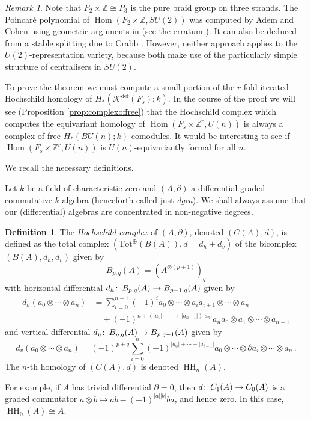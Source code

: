 \documentclass[oneside, a4paper, 12pt]{article}
\numberwithin{equation}{section}
\DeclareMathOperator{\Hom}{Hom}
\DeclareMathOperator{\HH}{HH}
\newcommand{\Kdef}{\mathcal{K}^{\mathrm{def}}}
\newcommand{\Z}{\mathbb{Z}}
\newcommand{\co}{\colon\thinspace}
\theoremstyle{plain}
\theoremstyle{definition}
\newtheorem{definition}[theorem]{Definition}
\theoremstyle{remark}
\newtheorem{remark}[theorem]{Remark}
\begin{document}
\begin{remark}
Note that $F_2\times \Z\cong P_3$ is the pure braid group on three strands. The Poincar{\'e} polynomial of $\Hom(F_2\times \Z,SU(2))$ was computed by Adem and Cohen using geometric arguments in \cite[Theorem 4.12]{AC} (see the erratum \cite{ACerratum}). It can also be deduced from a stable splitting due to Crabb \cite{Crabb}. However, neither approach applies to the $U(2)$-representation variety, because both make use of the particularly simple structure of centralisers in $SU(2)$. 
\end{remark}

To prove the theorem we must compute a small portion of the $r$-fold iterated Hochschild homology of $H_\ast(\Kdef(F_s);k)$. In the course of the proof we will see (Proposition \ref{prop:complexoffree}) that the Hochschild complex which computes the equivariant homology of $\Hom(F_s\times \Z^r,U(n))$ is always a complex of free $H_\ast(BU(n);k)$-comodules. It would be interesting to see if $\Hom(F_s\times \Z^r,U(n))$ is $U(n)$-equivariantly formal for all $n$.



We recall the necessary definitions.

Let $k$ be a field of characteristic zero and $(A,\partial)$ a differential graded commutative $k$-algebra (henceforth called just \emph{dgca}). We shall always assume that our (differential) algebras are concentrated in non-negative degrees.

\begin{definition} \label{def:hochschildcomplex}
The \emph{Hochschild complex} of $(A,\partial)$, denoted $(C(A),d)$, is defined as the total complex $(\mathrm{Tot}^{\oplus}(B(A)),d=d_h+d_v)$ of the bicomplex $(B(A),d_h,d_v)$ given by
\[
B_{p,q}(A)=(A^{\otimes (p+1)})_q
\]
with horizontal differential $d_h\co B_{p,q}(A)\to B_{p-1,q}(A)$ given by
\begin{equation*}
\begin{split}
d_h(a_0\otimes \cdots \otimes a_n) &= \sum_{i=0}^{n-1} (-1)^i a_0\otimes \cdots \otimes a_i a_{i+1} \otimes \cdots \otimes a_n \\&\quad + (-1)^{n+(|a_0|+\cdots + |a_{n-1}|)|a_n|} a_n a_0 \otimes a_1 \otimes \cdots \otimes a_{n-1} 
\end{split}
\end{equation*}
and vertical differential $d_v\co B_{p,q}(A)\to B_{p,q-1}(A)$ given by
\[
d_v(a_0\otimes \cdots \otimes a_n) = (-1)^{p+q} \sum_{i=0}^n (-1)^{|a_0|+\cdots + |a_{i-1}|}a_0\otimes \cdots \otimes \partial a_i \otimes \cdots \otimes a_n\, .
\]
The $n$-th homology of $(C(A),d)$ is denoted $\HH_n(A)$.
\end{definition}
For example, if $A$ has trivial differential $\partial=0$, then $d\co C_1(A)\to C_0(A)$ is a graded commutator $a\otimes b \mapsto ab-(-1)^{|a||b|}ba$, and hence zero. In this case, $\HH_0(A)\cong A$.
\end{document}
